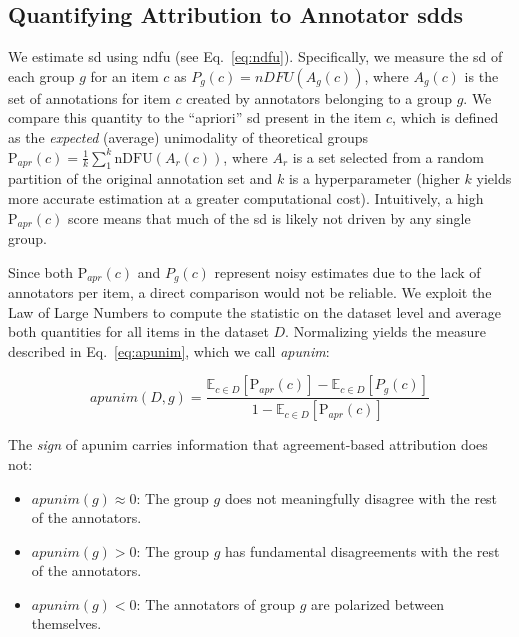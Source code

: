 \documentclass[manuscript,screen,review,anonymous]{acmart}
\theoremstyle{acmplain}
\theoremstyle{researchquestionstyle}
\begin{document}
\subsection{Quantifying Attribution to Annotator \acp{sdd}}

We estimate \ac{sd} using \ac{ndfu} (see Eq.~\ref{eq:ndfu}). Specifically, we measure the \ac{sd} of each group $g$ for an item $c$ as $P_g(c) = \textit{nDFU}(A_g(c))$, where $A_g(c)$ is the set of annotations for item $c$ created by annotators belonging to a group $g$. We compare this quantity to the ``apriori'' \ac{sd} present in the item $c$, which is defined as the \emph{expected} (average) unimodality of theoretical groups $\mathrm{P}_{\textit{apr}}(c) = \frac{1}{k} \sum_{1}^{k}  \mathrm{nDFU}(A_{r}(c))$, where $A_{r}$ is a set selected from a random partition of the original annotation set and $k$ is a hyperparameter (higher $k$ yields more accurate estimation at a greater computational cost). Intuitively, a high $\mathrm{P}_{\textit{apr}}(c)$ score means that much of the \ac{sd} is likely not driven by any single group.

Since both $\mathrm{P}_{\textit{apr}}(c)$ and $P_g(c)$ represent noisy estimates due to the lack of annotators per item, a direct comparison would not be reliable. We exploit the Law of Large Numbers to compute the statistic on the dataset level and average both quantities for all items in the dataset $D$. Normalizing yields the measure described in Eq.~\ref{eq:apunim}, which we call \emph{apunim}:

\begin{equation}
	\label{eq:apunim}
	\textit{apunim}(D, g) = \frac{\mathbb{E}_{c \in D} \left[ \mathrm{P}_{\textit{apr}}(c) \right] - \mathbb{E}_{c \in D} \left[ P_g(c)\right] }{1 - \mathbb{E}_{c \in D} \left[ \mathrm{P}_{\textit{apr}}(c) \right]}
\end{equation}

The \emph{sign} of apunim carries information that agreement-based attribution does not:
\begin{itemize}
	\item$\textit{apunim}(g) \approx 0$: The group $g$ does not meaningfully disagree with the rest of the annotators.
	\item $\textit{apunim}(g) > 0$: The group $g$ has fundamental disagreements with the rest of the annotators. 
	\item $\textit{apunim}(g) < 0$: The annotators of group $g$ are polarized between themselves.
\end{itemize}
\end{document}
